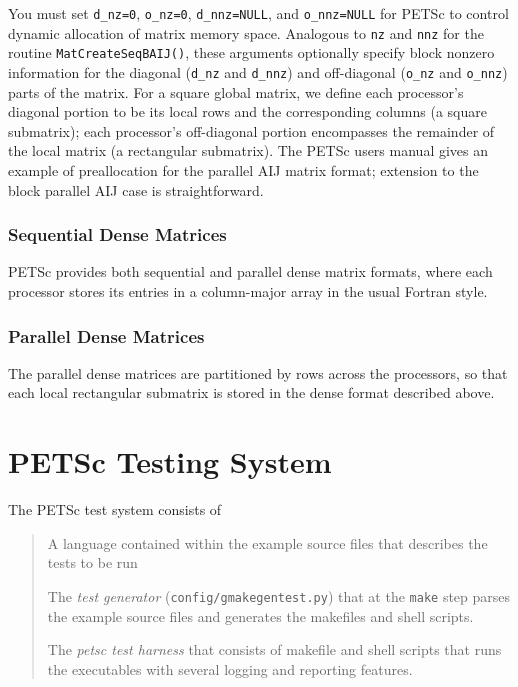 You must set \lstinline{d_nz=0}, \lstinline{o_nz=0}, \lstinline{d_nnz=NULL}, and
\lstinline{o_nnz=NULL} for PETSc to control dynamic allocation of matrix
memory space.  Analogous to \lstinline{nz} and \lstinline{nnz} for the routine
\lstinline{MatCreateSeqBAIJ()}, these arguments optionally specify
block nonzero information for the diagonal (\lstinline{d_nz} and \lstinline{d_nnz}) and
off-diagonal (\lstinline{o_nz} and \lstinline{o_nnz}) parts of the matrix.
For a square global matrix, we define each processor's diagonal portion
to be its local rows and the corresponding columns (a square submatrix);
each processor's off-diagonal portion encompasses the remainder of the
local matrix (a rectangular submatrix).
The PETSc users manual gives an example of preallocation for
the parallel AIJ matrix format; extension to the block parallel AIJ case
is straightforward.

\subsection{Sequential Dense Matrices}

PETSc provides both sequential and parallel dense matrix formats,
where each processor stores its entries in a column-major array in the
usual Fortran style.

\subsection{Parallel Dense Matrices}

The parallel dense matrices are partitioned by rows across the
processors, so that each local rectangular submatrix is stored in the
dense format described above.


\chapter{PETSc Testing System}
  \label{petsc-testing-system}


The PETSc test system consists of
%
\begin{quote}
\begin{list}{.}
{
\setlength{\rightmargin}{\leftmargin}
}

\item A language contained within the example source files that describes the
tests to be run

\item The \emph{test generator} (\lstinline{config/gmakegentest.py}) that at the
\lstinline{make} step parses the example source files and generates the makefiles
and shell scripts.

\item The \emph{petsc test harness} that consists of makefile and
shell scripts that runs the executables with several
logging and reporting features.
\end{list}

\end{quote}

